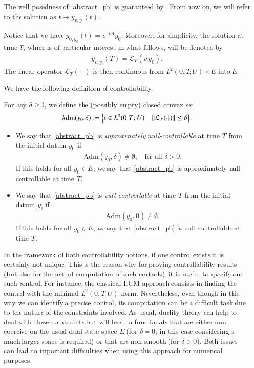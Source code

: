 The well posedness of \eqref{abstract_pb} is guaranteed by \cite[Theorem 2.37]{coron2007control}. From now on, we will refer to the solution as $t\mapsto y_{v,y_0}(t)$.

Notice that we have $y_{0,y_0}(t)= e^{-tA}y_0$. Moreover, for simplicity, the solution at time $T$, which is of particular interest in what follows, will be denoted by 
\begin{align*}
	y_{v,y_0}(T)=\mathcal{L}_T(v|y_0).
\end{align*} 
The linear operator $\mathcal{L}_T(\cdot|\cdot)$ is then continuous from $L^2(0,T;U)\times E$ into $E$.

We have the following definition of controllability.

\begin{definition}
For any $\delta\geq 0$, we define the (possibly empty) closed convex set 
\begin{align*}
	\textrm{Adm}(y_0,\delta):=\left\{v\in L^2(0,T;U)\,:\, {\left\|\mathcal{L}_T(\cdot|\cdot)\right\|}_{}\leq\delta\right\}.
\end{align*}
\begin{itemize}
	\item We say that \eqref{abstract_pb} is \textit{approximately null-controllable} at time $T$ from the initial datum $y_0$ if 
	\begin{align*}
		\textrm{Adm}(y_0,\delta)\neq\emptyset,\;\;\textrm{ for all } \delta>0.
	\end{align*}  
	If this holds for all $y_0\in E$, we say that \eqref{abstract_pb} is approximately null-controllable at time $T$. 
	
	\item We say that \eqref{abstract_pb} is \textit{null-controllable} at time $T$ from the initial datum $y_0$ if 
	\begin{align*}
		\textrm{Adm}(y_0,0)\neq\emptyset.
	\end{align*}	
	If this holds for all $y_0\in E$, we say that \eqref{abstract_pb} is null-controllable at time $T$.
\end{itemize} 
\end{definition}

In the framework of both controllability notions, if one control exists it is certainly not unique. This is the reason why for proving controllability results (but also for the actual computation of such controls), it is useful to specify one such control. For instance, the classical HUM approach consists in finding the control with the minimal $L^2(0,T;U)$-norm. Nevertheless, even though in this way we can identify a precise control, its computation can be a difficult task due to the nature of the constraints involved. As usual, duality theory can help to deal with these constraints but will lead to functionals that are either non coercive on the usual dual state space $E$ (for $\delta = 0$; in this
case considering a much larger space is required) or that are non smooth (for $\delta > 0$). Both issues can lead to important difficulties when using this approach for numerical purposes.

